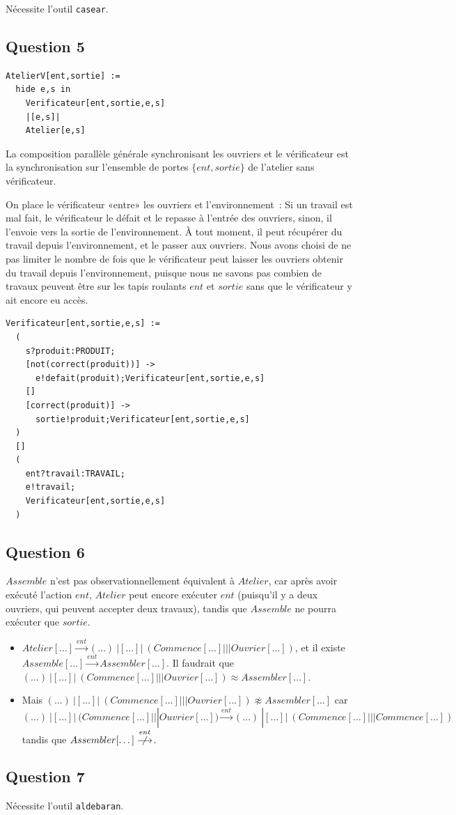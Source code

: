\documentclass[a4paper,french,12pt]{article}
\def\nottransition#1{\stackrel{#1}{\centernot\longrightarrow}}
\def\transition#1{\stackrel{#1}{\longrightarrow}}
\def\observationnelle{\approx}
\begin{document}
Nécessite l'outil \verb!casear!.

\subsection{Question 5}

\begin{verbatim}
AtelierV[ent,sortie] :=
  hide e,s in
    Verificateur[ent,sortie,e,s]
    |[e,s]|
    Atelier[e,s]
\end{verbatim}

La composition parallèle générale synchronisant les ouvriers et le
vérificateur est la synchronisation sur l'ensemble de portes
$\{ent,sortie\}$ de l'atelier sans vérificateur.

On place le vérificateur «entre» les ouvriers et l'environnement~: Si
un travail est mal fait, le vérificateur le défait et le repasse à
l'entrée des ouvriers, sinon, il l'envoie vers la sortie de
l'environnement. À tout moment, il peut récupérer du travail depuis
l'environnement, et le passer aux ouvriers. Nous avons choisi de ne
pas limiter le nombre de fois que le vérificateur peut laisser les
ouvriers obtenir du travail depuis l'environnement, puisque nous ne
savons pas combien de travaux peuvent être sur les tapis roulants
$ent$ et $sortie$ sans que le vérificateur y ait encore eu accès.

\begin{verbatim}
Verificateur[ent,sortie,e,s] :=
  (
    s?produit:PRODUIT;
    [not(correct(produit))] ->
      e!defait(produit);Verificateur[ent,sortie,e,s]
    []
    [correct(produit)] ->
      sortie!produit;Verificateur[ent,sortie,e,s]
  )
  []
  (
    ent?travail:TRAVAIL;
    e!travail;
    Verificateur[ent,sortie,e,s]
  )
\end{verbatim}

\subsection{Question 6}

$Assemble$ n'est pas observationnellement équivalent à $Atelier$, car
après avoir exécuté l'action $ent$, $Atelier$ peut encore exécuter
$ent$ (puisqu'il y a deux ouvriers, qui peuvent accepter deux
travaux), tandis que $Assemble$ ne pourra exécuter que $sortie$.

{\raggedright
  \begin{itemize}
  \item $Atelier[\dots] \transition{ent} (\dots) \ |[\dots]|\ (Commence[\dots] ||| Ouvrier[\dots])$,
    et il existe
    $Assemble[\dots] \transition{ent} Assembler[\dots]$. Il faudrait que 
    $(\dots) \ |[\dots]|\ (Commence[\dots] ||| Ouvrier[\dots]) \observationnelle Assembler[\dots]$.
  \item Mais
    $(\dots) \ |[\dots]|\ (Commence[\dots] ||| Ouvrier[\dots]) \not\observationnelle Assembler[\dots]$
    car $(\dots) \ |[\dots]|\ (Commence[\dots] ||| Ouvrier[\dots]) \transition{ent} (\dots) \ |[\dots]|\ (Commence[\dots] ||| Commence[\dots])$
    tandis que $Assembler[\dots] \nottransition{ent}$.
  \end{itemize}
}
\subsection{Question 7}

Nécessite l'outil \verb!aldebaran!.
\end{document}
